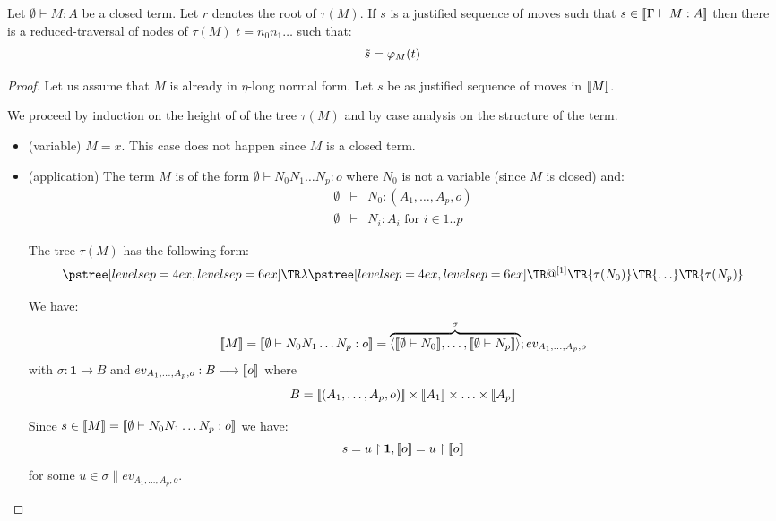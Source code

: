 \begin{prop}
\label{prop:rel_gamesem_redtrav_closed}
Let $\emptyset \vdash M : A$ be a closed term.
Let $r$ denotes the root of $\tau(M)$. If $s$ is a justified sequence of moves such
that $s \in {[\![\Gamma \vdash M:A ]\!]}$ then there is a reduced-traversal of nodes of $\tau(M)$
$t = n_0 n_1 \ldots$ such that:
 $$\tilde{s} =  \varphi_M(t)$$
\end{prop}
\begin{proof}
Let us assume that $M$ is already in $\eta$-long normal form.
Let $s$ be as justified sequence of moves in ${[\![ M ]\!]}$.

We proceed by induction on the height of of
the tree $\tau(M)$ and by case analysis on the structure of the term.

\begin{itemize}
  \item (variable) $M = x$. This case does not happen since $M$ is a closed term.

    \item (application) The term $M$ is of the form $\emptyset \vdash N_0 N_1 \ldots N_p : o$ where $N_0$ is not
    a variable (since $M$ is closed) and:
    \begin{eqnarray*}
    \emptyset &\vdash& N_0 : (A_1,\ldots,A_p,o)\\
    \emptyset &\vdash& N_i : A_i \mbox{ for } i \in 1..p
    \end{eqnarray*}

    The tree $\tau(M)$ has the following form:
    $$ \tree[levelsep=6ex]{\lambda}
        { \tree[levelsep=6ex]{@^{[1]}}
            {   \TR{\tau(N_0)} \TR{\ldots} \TR{\tau(N_p)}}}
    $$

    We have:
    $$\sem{M} = \sem{\emptyset \vdash N_0 N_1 \ldots N_p : o} = \overbrace{\langle \sem{\emptyset \vdash N_0}, \ldots, \sem{\emptyset \vdash N_p} \rangle}^\sigma ; ev_{A_1,\ldots,A_p,o}$$
    with $\sigma : \textbf{1} \longrightarrow B$ and $ev_{A_1,\ldots,A_p,o} : B \longrightarrow {[\![o ]\!]}$ where
    $$ B = {[\![ (A_1,\ldots,A_p,o) ]\!]} \times {[\![A_1 ]\!]} \times \ldots \times {[\![A_p ]\!]} $$

    Since $s \in {[\![M ]\!]} = {[\![ \emptyset \vdash N_0 N_1 \ldots N_p : o ]\!]}$ we have:
    \begin{equation*}
        s = u \upharpoonright \textbf{1},{[\![ o ]\!]} = u \upharpoonright {[\![o ]\!]}
    \end{equation*}
    for some $u \in \sigma \parallel ev_{A_1,\ldots,A_p,o}$.


\end{itemize}
\end{proof}

